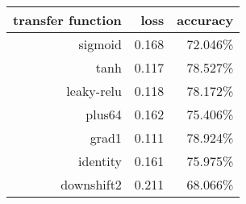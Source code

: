\begin{tabular}{rrr}
{\bf transfer function} & {\bf loss} & {\bf accuracy} \\
\hline 
sigmoid & 0.168 & 72.046\% \\
tanh & 0.117 & 78.527\% \\
leaky-relu & 0.118 & 78.172\% \\
plus64 & 0.162 & 75.406\% \\
grad1 & 0.111 & 78.924\% \\
identity & 0.161 & 75.975\% \\
downshift2 & 0.211 & 68.066\% \\
\end{tabular}
